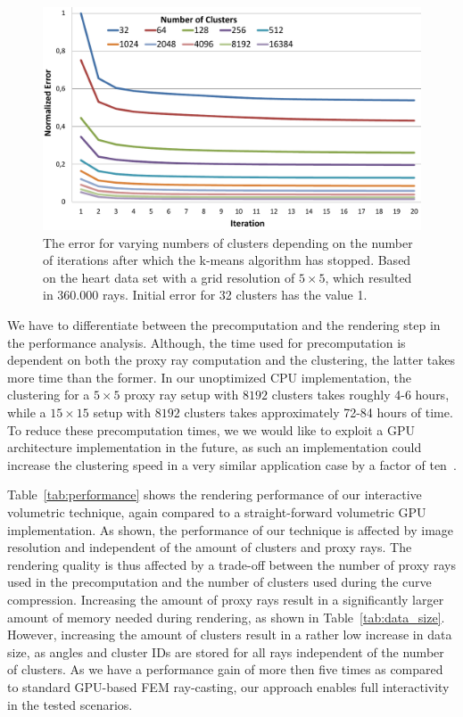 \documentclass[review,journal]{vgtc}         %
\begin{document}
\begin{figure}[t]
    \centering 
    \includegraphics[width=0.85\linewidth]{figures/diagram_num_clusters}
    \caption{The error for varying numbers of clusters depending on the number of iterations after which the k-means algorithm has stopped. Based on the heart data set with a grid resolution of $5\times5$, which resulted in 360.000 rays. Initial error for 32 clusters has the value 1.}
    \label{fig:clustering_epsilon_error}
\end{figure}

We have to differentiate between the precomputation and the rendering step in the performance analysis. Although, the time used for precomputation is dependent on both the proxy ray computation and the clustering, the latter takes more time than the former. In our unoptimized CPU implementation, the clustering for a $5\times5$ proxy ray setup with $8192$ clusters takes roughly 4-6 hours, while a $15\times15$ setup with $8192$ clusters takes approximately 72-84 hours of time. To reduce these precomputation times, we we would like to exploit a GPU architecture implementation in the future, as such an implementation could increase the clustering speed in a very similar application case by a factor of ten~\cite{mess10gpuclustering}. 

Table~\ref{tab:performance} shows the rendering performance of our interactive volumetric technique, again compared to a straight-forward volumetric GPU implementation. As shown, the performance of our technique is affected by image resolution and independent of the amount of clusters and proxy rays. The rendering quality is thus affected by a trade-off between the number of proxy rays used in the precomputation and the number of clusters used during the curve compression. Increasing the amount of proxy rays result in a significantly larger amount of memory needed during rendering, as shown in Table~\ref{tab:data_size}. However, increasing the amount of clusters result in a rather low increase in data size, as angles and cluster IDs are stored for all rays independent of the number of clusters. As we have a performance gain of more then five times as compared to standard GPU-based FEM ray-casting, our approach enables full interactivity in the tested scenarios.
\end{document}
